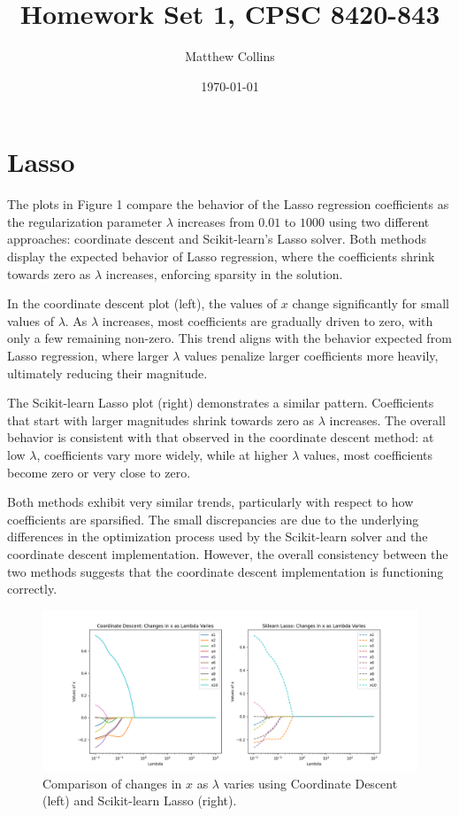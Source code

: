 \documentclass{article}
\begin{document}
\title{Homework Set 1, CPSC 8420-843}
\author{Matthew Collins}
\date{\today}
\maketitle

\section{Lasso}

The plots in Figure 1 compare the behavior of the Lasso regression coefficients as the regularization parameter $\lambda$ increases from $0.01$ to $1000$ using two different approaches: coordinate descent and Scikit-learn’s Lasso solver. Both methods display the expected behavior of Lasso regression, where the coefficients shrink towards zero as $\lambda$ increases, enforcing sparsity in the solution.

In the coordinate descent plot (left), the values of $x$ change significantly for small values of $\lambda$. As $\lambda$ increases, most coefficients are gradually driven to zero, with only a few remaining non-zero. This trend aligns with the behavior expected from Lasso regression, where larger $\lambda$ values penalize larger coefficients more heavily, ultimately reducing their magnitude. 

The Scikit-learn Lasso plot (right) demonstrates a similar pattern. Coefficients that start with larger magnitudes shrink towards zero as $\lambda$ increases. The overall behavior is consistent with that observed in the coordinate descent method: at low $\lambda$, coefficients vary more widely, while at higher $\lambda$ values, most coefficients become zero or very close to zero. 

Both methods exhibit very similar trends, particularly with respect to how coefficients are sparsified. The small discrepancies are due to the underlying differences in the optimization process used by the Scikit-learn solver and the coordinate descent implementation. However, the overall consistency between the two methods suggests that the coordinate descent implementation is functioning correctly.

\begin{figure}[htbp]
    \centering
    \includegraphics[width=\textwidth]{sln_figures/fig1.png}
    \caption{Comparison of changes in $x$ as $\lambda$ varies using Coordinate Descent (left) and Scikit-learn Lasso (right).}
\end{figure}
\FloatBarrier
\end{document}
